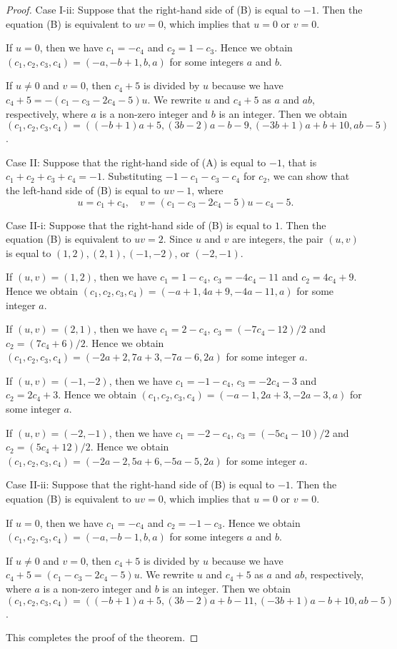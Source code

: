 \documentclass{amsart}
\theoremstyle{plain}
\theoremstyle{definition}
\theoremstyle{remark}
\begin{document}
\begin{proof}
Case I-ii: 
Suppose that the right-hand side of (B) is equal to $-1$. 
Then the equation (B) is equivalent to $uv=0$, which implies that $u=0$ or $v=0$. 

If $u=0$, then we have $c_1=-c_4$ and $c_2=1-c_3$. 
Hence we obtain 
$(c_1,c_2,c_3,c_4)=(-a,-b+1,b,a)$ 
for some integers $a$ and $b$. 

If $u\ne 0$ and $v=0$, then $c_4+5$ is divided by $u$ 
because we have $c_4+5=-(c_1-c_3-2c_4-5)u$. 
We rewrite $u$ and $c_4+5$ as $a$ and $ab$, respectively, 
where $a$ is a non-zero integer and $b$ is an integer. 
Then we obtain 
$(c_1,c_2,c_3,c_4)=((-b+1)a+5, (3b-2)a-b-9, (-3b+1)a+b+10, ab-5)$. 

Case II: 
Suppose that the right-hand side of (A) is equal to $-1$, that is $c_1+c_2+c_3+c_4=-1$. 
Substituting $-1-c_1-c_3-c_4$ for $c_2$, we can show that the left-hand side of (B) 
is equal to $uv-1$, 
where
\[
u=c_1+c_4,\quad 
v=(c_1-c_3-2c_4-5)u-c_4-5. 
\]

Case II-i: 
Suppose that the right-hand side of (B) is equal to $1$. 
Then the equation (B) is equivalent to $uv=2$. 
Since $u$ and $v$ are integers, the pair $(u,v)$ is equal to $(1,2), (2,1), (-1,-2)$, or $(-2,-1)$. 

If $(u,v)=(1,2)$, then we have $c_1=1-c_4$, $c_3=-4c_4-11$ and $c_2=4c_4+9$. 
Hence we obtain 
$(c_1,c_2,c_3,c_4)=(-a+1,4a+9,-4a-11,a)$ 
for some integer $a$. 

If $(u,v)=(2,1)$, then we have $c_1=2-c_4$, $c_3=(-7c_4-12)/2$ and $c_2=(7c_4+6)/2$. 
Hence we obtain 
$(c_1,c_2,c_3,c_4)=(-2a+2,7a+3,-7a-6,2a)$ 
for some integer $a$. 

If $(u,v)=(-1,-2)$, then we have $c_1=-1-c_4$, $c_3=-2c_4-3$ and $c_2=2c_4+3$. 
Hence we obtain 
$(c_1,c_2,c_3,c_4)=(-a-1,2a+3,-2a-3,a)$ 
for some integer $a$. 

If $(u,v)=(-2,-1)$, then we have $c_1=-2-c_4$, $c_3=(-5c_4-10)/2$ and $c_2=(5c_4+12)/2$. 
Hence we obtain 
$(c_1,c_2,c_3,c_4)=(-2a-2,5a+6,-5a-5,2a)$ 
for some integer $a$. 

Case II-ii: 
Suppose that the right-hand side of (B) is equal to $-1$. 
Then the equation (B) is equivalent to $uv=0$, which implies that $u=0$ or $v=0$. 

If $u=0$, then we have $c_1=-c_4$ and $c_2=-1-c_3$. 
Hence we obtain 
$(c_1,c_2,c_3,c_4)=(-a,-b-1,b,a)$ 
for some integers $a$ and $b$. 

If $u\ne 0$ and $v=0$, then $c_4+5$ is divided by $u$ 
because we have $c_4+5=(c_1-c_3-2c_4-5)u$. 
We rewrite $u$ and $c_4+5$ as $a$ and $ab$, respectively, 
where $a$ is a non-zero integer and $b$ is an integer. 
Then we obtain 
$(c_1,c_2,c_3,c_4)=((-b+1)a+5, (3b-2)a+b-11, (-3b+1)a-b+10, ab-5)$. 

This completes the proof of the theorem. 
\end{proof}
\end{document}
